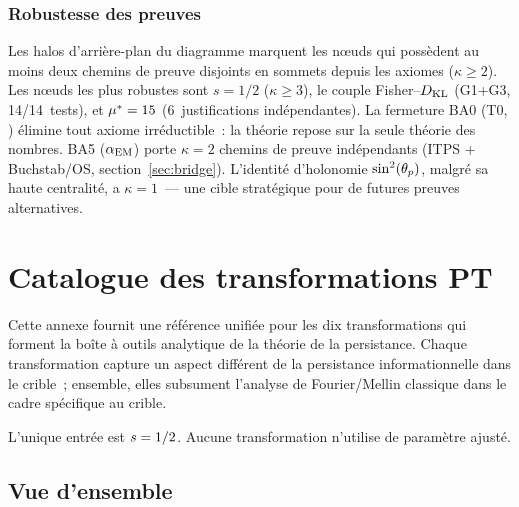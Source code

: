 \documentclass[12pt,a4paper]{article}
\begin{document}
\subsubsection*{Robustesse des preuves}
\label{sec:app_h_robustness}

Les halos d'arrière-plan du diagramme marquent les n{\oe}uds qui
possèdent au moins deux chemins de preuve disjoints en sommets
depuis les axiomes ($\kappa \geq 2$). Les n{\oe}uds les plus
robustes sont $s = 1/2$ ($\kappa \geq 3$), le couple
Fisher--$D_{\mathrm{KL}}$ (G1+G3, 14/14~tests), et ${\mu^{*}} = 15$
(6~justifications indépendantes). La fermeture BA0 (T0,
\cite{companion_M3}) élimine tout axiome irréductible~: la théorie
repose sur la seule théorie des nombres. BA5 ($\alpha_{\mathrm{EM}}$) porte
$\kappa = 2$ chemins de preuve indépendants (ITPS + Buchstab/OS,
section~\ref{sec:bridge}). L'identité d'holonomie $\sin^2(\theta_{p})$, malgré
sa haute centralité, a $\kappa = 1$~--- une cible stratégique pour
de futures preuves alternatives.


\newpage

\section{Catalogue des transformations PT}
\label{app:transformations}

Cette annexe fournit une référence unifiée pour les dix
transformations qui forment la boîte à outils analytique de la
théorie de la persistance. Chaque transformation capture un aspect
différent de la persistance informationnelle dans le crible~;
ensemble, elles subsument l'analyse de Fourier/Mellin classique
dans le cadre spécifique au crible.

L'unique entrée est $s = 1/2$. Aucune transformation n'utilise
de paramètre ajusté.

\subsection*{Vue d'ensemble}
\end{document}
